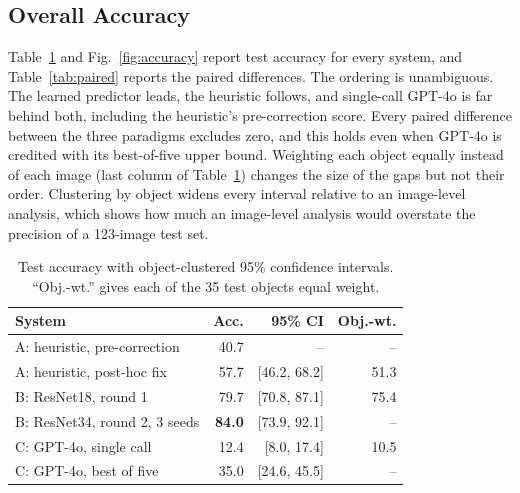 \documentclass[10pt,conference,compsoc]{IEEEtran}
\begin{document}
\subsection{Overall Accuracy}

Table~\ref{tab:accuracy} and Fig.~\ref{fig:accuracy} report test accuracy for
every system, and Table~\ref{tab:paired} reports the paired differences. The
ordering is unambiguous. The learned predictor leads, the heuristic follows,
and single-call GPT-4o is far behind both, including the heuristic's
pre-correction score. Every paired difference between the three paradigms
excludes zero, and this holds even when GPT-4o is credited with its
best-of-five upper bound. Weighting each object equally instead of each image
(last column of Table~\ref{tab:accuracy}) changes the size of the gaps but
not their order. Clustering by object widens every interval relative to an
image-level analysis, which shows how much an image-level analysis would
overstate the precision of a 123-image test set.

\begin{table}[t]
\caption{Test accuracy with object-clustered 95\% confidence intervals.
``Obj.-wt.'' gives each of the 35 test objects equal weight.}
\label{tab:accuracy}
\centering
\footnotesize
\begin{tabular}{lrrr}
\toprule
System & Acc. & 95\% CI & Obj.-wt. \\
\midrule
A: heuristic, pre-correction & 40.7 & -- & -- \\
A: heuristic, post-hoc fix & 57.7 & [46.2, 68.2] & 51.3 \\
B: ResNet18, round 1 & 79.7 & [70.8, 87.1] & 75.4 \\
B: ResNet34, round 2, 3 seeds & \textbf{84.0} & [73.9, 92.1] & -- \\
C: GPT-4o, single call & 12.4 & [8.0, 17.4] & 10.5 \\
C: GPT-4o, best of five & 35.0 & [24.6, 45.5] & -- \\
\bottomrule
\end{tabular}
\end{table}
\end{document}
